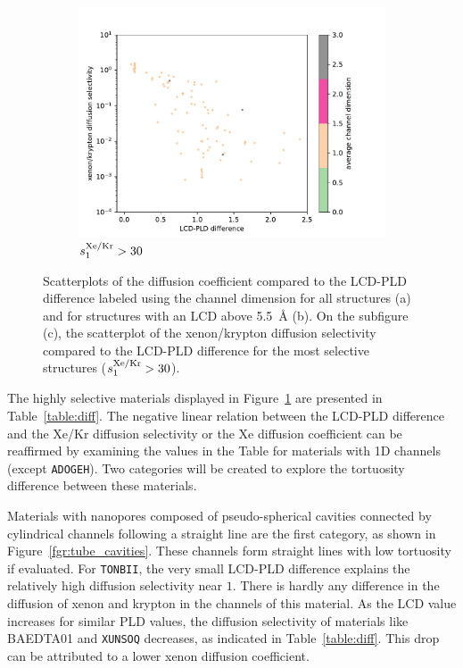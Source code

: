 \documentclass[main]{subfiles}
\begin{document}
\begin{figure}[ht]
\begin{subfigure}[b]{0.32\textwidth}
      \centering
      \includegraphics[width=\textwidth]{figures/5-diffusion/diff_D_xekr-poresize-chandim.pdf}
      \caption{$s^{\text{Xe/Kr}}_1>30$}\label{fgr:porediff_c}
  \end{subfigure}
     \caption{ Scatterplots of the diffusion coefficient compared to the LCD-PLD difference labeled using the channel dimension for all structures (a) and for structures with an LCD above \SI{5.5}{\angstrom} (b). On the subfigure (c), the scatterplot of the xenon/krypton diffusion selectivity compared to the LCD-PLD difference for the most selective structures ($s^{\text{Xe/Kr}}_1>30$). }\label{fgr:porediff}
\end{figure}

The highly selective materials displayed in Figure~\ref{fgr:porediff_c} are presented in Table~\ref{table:diff}. The negative linear relation between the LCD-PLD difference and the Xe/Kr diffusion selectivity or the Xe diffusion coefficient can be reaffirmed by examining the values in the Table for materials with 1D channels (except \texttt{ADOGEH}). Two categories will be created to explore the tortuosity difference between these materials.

Materials with nanopores composed of pseudo-spherical cavities connected by cylindrical channels following a straight line are the first category, as shown in Figure~\ref{fgr:tube_cavities}. These channels form straight lines with low tortuosity if evaluated. For \texttt{TONBII}, the very small LCD-PLD difference explains the relatively high diffusion selectivity near $1$. There is hardly any difference in the diffusion of xenon and krypton in the channels of this material. As the LCD value increases for similar PLD values, the diffusion selectivity of materials like BAEDTA01 and \texttt{XUNSOQ} decreases, as indicated in Table~\ref{table:diff}. This drop can be attributed to a lower xenon diffusion coefficient.
\end{document}
